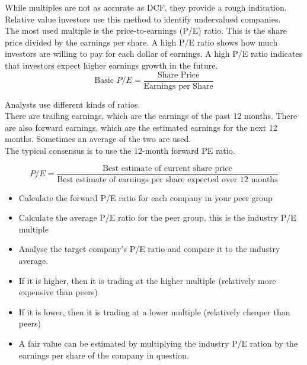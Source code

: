 While multiples are not as accurate as DCF, they provide a rough indication. Relative value investors use this method to identify undervalued companies.\\

The most used multiple is the price-to-earnings (P/E) ratio. This is the share price divided by the earnings per share. A high P/E ratio shows how much investors are willing to pay for each dollar of earnings. A high P/E ratio
indicates that investors expect higher earnings growth in the future.\\

\begin{equation}
    \text{Basic }P/E = \frac{\text{Share Price}}{\text{Earnings per Share}}
\end{equation}

Analysts use different kinds of ratios.\\

There are trailing earnings, which are the earnings of the past 12 months. There are also forward earnings, which are the estimated earnings for the next 12 months. Sometimes an average of the two are used.\\

The typical consensus is to use the 12-month forward PE ratio.

\begin{equation}
    P/E = \frac{\text{Best estimate of current share price}}{\text{Best estimate of earnings per share expected over 12 months}}
\end{equation}

\begin{itemize}
    \item Calculate the forward P/E ratio for each company in your peer group
    \item Calculate the average P/E ratio for the peer group, this is the industry P/E multiple
    \item Analyse the target company's P/E ratio and compare it to the industry average.
    \item If it is higher, then it is trading at the higher multiple (relatively more expensive than peers)
    \item If it is lower, then it is trading at a lower multiple (relatively cheaper than peers)
    \item A fair value can be estimated by multiplying the industry P/E ration by the earnings per share of the company in question.

\end{itemize}

